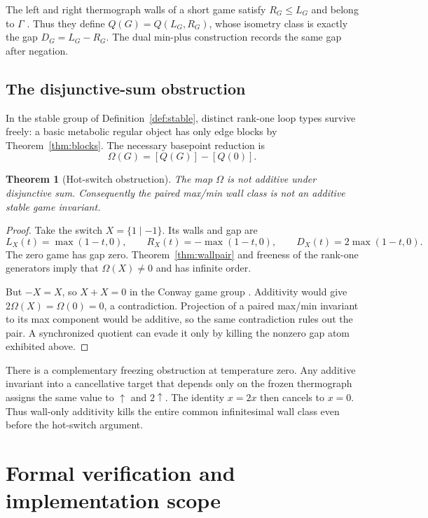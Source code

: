 \documentclass[11pt]{article}
\newtheorem{theorem}{Theorem}[section]
\theoremstyle{definition}
\theoremstyle{remark}
\begin{document}
The left and right thermograph walls of a short game satisfy \(R_G\le L_G\)
and belong to \(\Gamma\) \cite{siegel2013}.  Thus they define \(Q(G)=
Q(L_G,R_G)\), whose isometry class is exactly the gap \(D_G=L_G-R_G\).
The dual min-plus construction records the same gap after negation.

\subsection{The disjunctive-sum obstruction}

In the stable group of Definition~\ref{def:stable}, distinct rank-one loop
types survive freely: a basic metabolic regular object has only edge blocks by
Theorem~\ref{thm:blocks}.  The necessary basepoint reduction is
\[
 \Omega(G)=[Q(G)]-[Q(0)].
\]

\begin{theorem}[Hot-switch obstruction]\label{thm:wallnogo}
The map \(\Omega\) is not additive under disjunctive sum.  Consequently the
paired max/min wall class is not an additive stable game invariant.
\end{theorem}

\begin{proof}
Take the switch \(X=\{1\mid-1\}\).  Its walls and gap are
\[
 L_X(t)=\max(1-t,0),\qquad
 R_X(t)=-\max(1-t,0),\qquad
 D_X(t)=2\max(1-t,0).
\]
The zero game has gap zero.  Theorem~\ref{thm:wallpair} and freeness of the
rank-one generators imply that \(\Omega(X)\ne0\) and has infinite order.

But \(-X=X\), so \(X+X=0\) in the Conway game group
\cite{conway1976}.  Additivity would give
\(2\Omega(X)=\Omega(0)=0\), a contradiction.  Projection of a paired max/min
invariant to its max component would be additive, so the same contradiction
rules out the pair.  A synchronized quotient can evade it only by killing the
nonzero gap atom exhibited above.
\end{proof}

There is a complementary freezing obstruction at temperature zero.  Any
additive invariant into a cancellative target that depends only on the frozen
thermograph assigns the same value to \(\uparrow\) and \(2\uparrow\).  The
identity \(x=2x\) then cancels to \(x=0\).  Thus wall-only additivity kills the
entire common infinitesimal wall class even before the hot-switch argument.

\section{Formal verification and implementation scope}\label{sec:formal}
\end{document}
